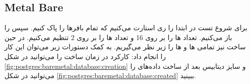 \subsection{Metal Bare}
برای شروع تست در ابتدا
را ری استارت می‌کنیم که تمام بافر‌ها را پاک کنیم. سپس
را باز می‌کنیم. تعداد
ها
را بر روی 16 و تعداد
ها
را بر روی 2 تنظیم می‌کنیم. در حین ساخت
نیز تمامی
ها و ها
را زیر نظر می‌گیریم. به کمک دستورات زیر می‌توان این کار را انجام داد:
کارکرد
در زمان ساخت را می‌توانید در شکل
\ref{fig:postgres:baremetal:database:creation}
و سایز دیتابیس بعد از ساخت داده‌های
را می‌توانید در شکل
\ref{fig:postgres:baremetal:database:created}
ببینید.
